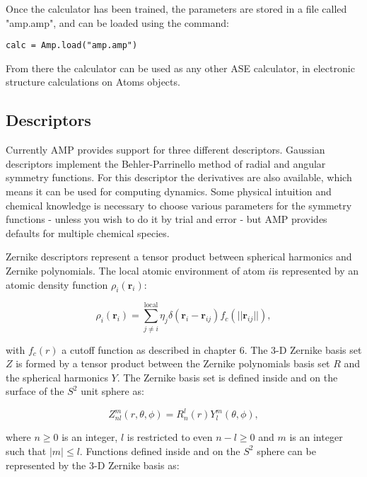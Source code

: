 Once the calculator has been trained, the parameters
are stored in a file called "amp.amp",
and can be loaded using the command:

\begin{lstlisting}
calc = Amp.load("amp.amp")
\end{lstlisting}

From there the calculator can be used as any other ASE calculator,
in electronic structure calculations on Atoms objects.

\subsection{Descriptors}
Currently AMP provides support for three different descriptors.
Gaussian descriptors implement the Behler-Parrinello method
of radial and angular symmetry functions. For this descriptor
the derivatives are also available, which means it can be used
for computing dynamics. Some physical intuition and chemical knowledge
is necessary to choose various parameters for the symmetry functions -
unless you wish to do it by trial and error - but AMP provides
defaults for multiple chemical species.
\par
Zernike descriptors represent a tensor product between spherical
harmonics and Zernike polynomials. The local atomic environment
of atom $i$is represented by an atomic density function $\rho_i(\bm{r}_i)$:



\begin{equation}
 \rho_i(\bm{r}_i) = \sum_{j\neq i}^{\text{local}}
    \eta_j \delta \left( \bm{r}_i - \bm{r}_{ij} \right)
    f_c \left( \lvert \lvert \bm{r}_{ij} \rvert \rvert \right) , 
\end{equation}


with $f_c(r)$ a cutoff function as described in chapter 6.
The 3-D Zernike basis set $Z$ is formed by a tensor product between
the Zernike polynomials basis set $R$ and the spherical harmonics
$Y$. The Zernike basis set is defined inside and on the surface
of the $S^2$ unit sphere as:


\begin{equation}
 Z_{nl}^m (r, \theta, \phi) = R_n^l(r) Y_l^m(\theta, \phi) , 
\end{equation}


where $n \geq 0$ is an integer, $l$ is restricted to even $n - l \geq 0$
and $m$ is an integer such that $\left| m \right| \leq l$.
Functions defined inside and on the $S^2$ sphere
can be represented by the 3-D Zernike basis as:


